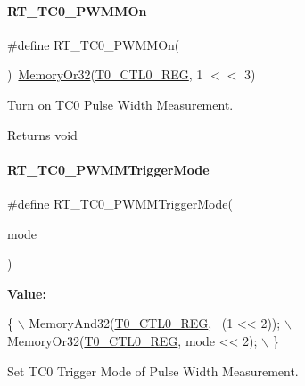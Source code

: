 \paragraph{\texorpdfstring{R\+T\+\_\+\+T\+C0\+\_\+\+P\+W\+M\+M\+On}{RT\_TC0\_PWMMOn}}
{\footnotesize\ttfamily \#define R\+T\+\_\+\+T\+C0\+\_\+\+P\+W\+M\+M\+On(\begin{DoxyParamCaption}{ }\end{DoxyParamCaption})~\mbox{\hyperlink{a00020_a27874a97deab7cecdde5ddecf466e31e}{Memory\+Or32}}(\mbox{\hyperlink{a00020_adadaa0ab1ebbd7ba9b70dfd24c3ed44da869abf9d87f78f45a0e07ad352abb39e}{T0\+\_\+\+C\+T\+L0\+\_\+\+R\+EG}}, 1 $<$$<$ 3)}



Turn on T\+C0 Pulse Width Measurement. 

\begin{DoxyReturn}{Returns}
void 
\end{DoxyReturn}
\mbox{\label{a00041_a48f8c6b4e5fba0057564f92060449557}} 
\paragraph{\texorpdfstring{R\+T\+\_\+\+T\+C0\+\_\+\+P\+W\+M\+M\+Trigger\+Mode}{RT\_TC0\_PWMMTriggerMode}}
{\footnotesize\ttfamily \#define R\+T\+\_\+\+T\+C0\+\_\+\+P\+W\+M\+M\+Trigger\+Mode(\begin{DoxyParamCaption}\item[{}]{mode }\end{DoxyParamCaption})}

{\bfseries Value\+:}
\begin{DoxyCode}
\{                                        \(\backslash\)
        MemoryAnd32(\mbox{\hyperlink{a00020_adadaa0ab1ebbd7ba9b70dfd24c3ed44da869abf9d87f78f45a0e07ad352abb39e}{T0\_CTL0\_REG}}, ~(1 << 2)); \(\backslash\)
        MemoryOr32(\mbox{\hyperlink{a00020_adadaa0ab1ebbd7ba9b70dfd24c3ed44da869abf9d87f78f45a0e07ad352abb39e}{T0\_CTL0\_REG}}, mode << 2);  \(\backslash\)
    \}
\end{DoxyCode}


Set T\+C0 Trigger Mode of Pulse Width Measurement. 



